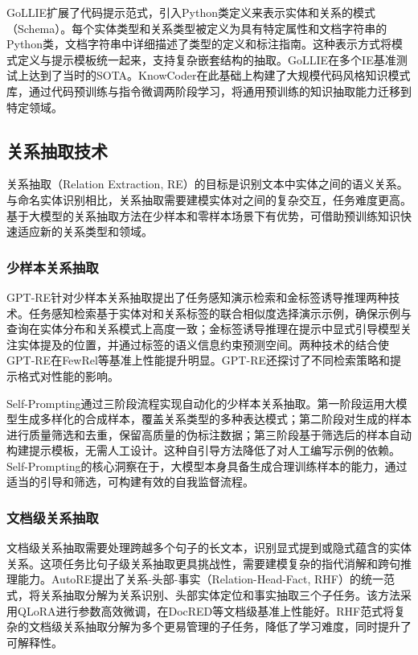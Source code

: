 GoLLIE扩展了代码提示范式\cite{gollie_2023}，引入Python类定义来表示实体和关系的模式（Schema）。每个实体类型和关系类型被定义为具有特定属性和文档字符串的Python类，文档字符串中详细描述了类型的定义和标注指南。这种表示方式将模式定义与提示模板统一起来，支持复杂嵌套结构的抽取。GoLLIE在多个IE基准测试上达到了当时的SOTA。KnowCoder\cite{knowcoder_2024}在此基础上构建了大规模代码风格知识模式库，通过代码预训练与指令微调两阶段学习，将通用预训练的知识抽取能力迁移到特定领域。

\subsection{关系抽取技术}

关系抽取（Relation Extraction, RE）的目标是识别文本中实体之间的语义关系。与命名实体识别相比，关系抽取需要建模实体对之间的复杂交互，任务难度更高。基于大模型的关系抽取方法在少样本和零样本场景下有优势，可借助预训练知识快速适应新的关系类型和领域。

\subsubsection{少样本关系抽取}

GPT-RE针对少样本关系抽取提出了任务感知演示检索和金标签诱导推理两种技术\cite{gpt_re_2023}。任务感知检索基于实体对和关系标签的联合相似度选择演示示例，确保示例与查询在实体分布和关系模式上高度一致；金标签诱导推理在提示中显式引导模型关注实体提及的位置，并通过标签的语义信息约束预测空间。两种技术的结合使GPT-RE在FewRel等基准上性能提升明显。GPT-RE还探讨了不同检索策略和提示格式对性能的影响。

Self-Prompting\cite{self_prompting_re_2024}通过三阶段流程实现自动化的少样本关系抽取。第一阶段运用大模型生成多样化的合成样本，覆盖关系类型的多种表达模式；第二阶段对生成的样本进行质量筛选和去重，保留高质量的伪标注数据；第三阶段基于筛选后的样本自动构建提示模板，无需人工设计。这种自引导方法降低了对人工编写示例的依赖。Self-Prompting的核心洞察在于，大模型本身具备生成合理训练样本的能力，通过适当的引导和筛选，可构建有效的自我监督流程。

\subsubsection{文档级关系抽取}

文档级关系抽取需要处理跨越多个句子的长文本，识别显式提到或隐式蕴含的实体关系。这项任务比句子级关系抽取更具挑战性，需要建模复杂的指代消解和跨句推理能力。AutoRE提出了关系-头部-事实（Relation-Head-Fact, RHF）的统一范式\cite{auto_re_2024}，将关系抽取分解为关系识别、头部实体定位和事实抽取三个子任务。该方法采用QLoRA进行参数高效微调，在DocRED等文档级基准上性能好。RHF范式将复杂的文档级关系抽取分解为多个更易管理的子任务，降低了学习难度，同时提升了可解释性。

